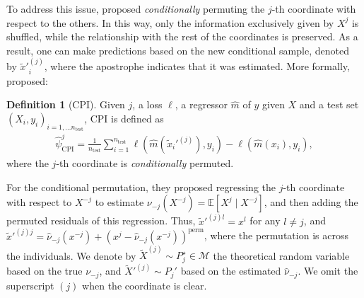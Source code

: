 \documentclass{article}
\theoremstyle{plain}
\theoremstyle{definition}
\newtheorem{definition}[theorem]{Definition}
\theoremstyle{remark}
\begin{document}


To address this issue, \citet{Strobl2008} proposed \textit{conditionally} permuting the $j$-th coordinate with respect to the others. In this way, only the information exclusively given by $X^j$ is shuffled, while the relationship with the rest of the coordinates is preserved. As a result, one can make predictions based on the new conditional sample, denoted by $\widetilde{x}'^{(j)}_i$, 
where the apostrophe indicates that it was estimated. %
 More formally, \citet{chamma2024statistically} proposed:

\begin{definition}[CPI] Given $j$, a loss $\ell$, a regressor $\widehat{m}$ of $y$ given $X$ and a test set $(X_i, y_i)_{i=1,\ldots n_\mathrm{test}}$, CPI is defined as
\begin{align*}
    \widehat{\psi}_{\mathrm{CPI}}^j=\frac{1}{n_{\mathrm{test}}}\sum_{i=1}^{n_{\mathrm{test}}}\ell\left(\widehat{m}(\widetilde{x}_{i}'^{(j)}),y_i\right)-\ell\left(\widehat{m}(x_{i}), y_i\right),
\end{align*}
where the $j$-th coordinate is \textit{conditionally} permuted.
\end{definition}

For the conditional permutation, they proposed regressing the $j$-th coordinate with respect to $X^{-j}$ to estimate $\nu_{-j}(X^{-j}) = \mathbb{E}[X^j \mid X^{-j}]$, and then adding the permuted residuals of this regression. Thus, $\widetilde{x}'^{(j)l} = x^l$ for any $l \neq j$, and $\widetilde{x}'^{(j)j} = \widehat{\nu}_{-j}(x^{-j}) + (x^j - \widehat{\nu}_{-j}(x^{-j}))^\mathrm{perm}$, where the permutation is across the individuals. We denote by $\widetilde{X}^{(j)} \sim P_j^\star \in \mathcal{M}$ the theoretical random variable based on the true $\nu_{-j}$, and $\widetilde{X}'^{(j)} \sim P_j'$ based on the estimated $\widehat{\nu}_{-j}$. We omit the superscript $(j)$ when the coordinate is clear.
\end{document}
